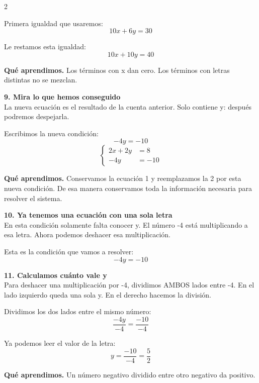 \documentclass[11pt,a4paper,landscape]{article}
\begin{document}
\begin{multicols*}{2}
\begin{minipage}{\linewidth}
\par\smallskip Primera igualdad que usaremos:
\[10x + 6y = 30\]
\par\smallskip Le restamos esta igualdad:
\[10x + 10y = 40\]
\par\smallskip\textbf{Qué aprendimos.} Los términos con x dan cero. Los términos con letras distintas no se mezclan.
\end{minipage}\par\medskip
\noindent\begin{minipage}{\linewidth}\textbf{9. Mira lo que hemos conseguido}\\[2pt]La nueva ecuación es el resultado de la cuenta anterior. Solo contiene y: después podremos despejarla.
\par\smallskip Escribimos la nueva condición:
\[-4y = -10\]
\[\left\{\begin{aligned}2x + 2y &= 8\\-4y &= -10\end{aligned}\right.\]
\par\smallskip\textbf{Qué aprendimos.} Conservamos la ecuación 1 y reemplazamos la 2 por esta nueva condición. De esa manera conservamos toda la información necesaria para resolver el sistema.
\end{minipage}\par\medskip
\noindent\begin{minipage}{\linewidth}\textbf{10. Ya tenemos una ecuación con una sola letra}\\[2pt]En esta condición solamente falta conocer y. El número -4 está multiplicando a esa letra. Ahora podemos deshacer esa multiplicación.
\par\smallskip Esta es la condición que vamos a resolver:
\[-4y = -10\]
\end{minipage}\par\medskip
\noindent\begin{minipage}{\linewidth}\textbf{11. Calculamos cuánto vale y}\\[2pt]Para deshacer una multiplicación por -4, dividimos AMBOS lados entre -4. En el lado izquierdo queda una sola y. En el derecho hacemos la división.
\par\smallskip Dividimos los dos lados entre el mismo número:
\[\frac{-4y}{-4}=\frac{-10}{-4}\]
\par\smallskip Ya podemos leer el valor de la letra:
\[y=\frac{-10}{-4}=\frac{5}{2}\]
\par\smallskip\textbf{Qué aprendimos.} Un número negativo dividido entre otro negativo da positivo.

\end{minipage}
\end{multicols*}
\end{document}
